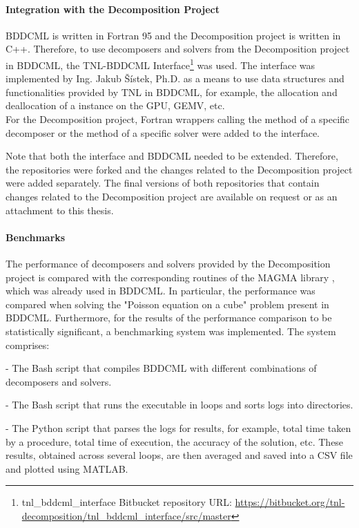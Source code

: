 \paragraph{Integration with the Decomposition Project} BDDCML is written in Fortran 95 and the Decomposition project is written in C++.
Therefore, to use decomposers and solvers from the Decomposition project in BDDCML, the TNL-BDDCML Interface\footnote{tnl\_bddcml\_interface Bitbucket repository URL: \url{https://bitbucket.org/tnl-decomposition/tnl_bddcml_interface/src/master}} was used.
The interface was implemented by Ing.
Jakub Šístek, Ph.D. as a means to use data structures and functionalities provided by TNL in BDDCML, for example, the allocation and deallocation of a  instance on the GPU, GEMV, etc.\\
For the Decomposition project, Fortran wrappers calling the  method of a specific decomposer or the  method of a specific solver were added to the interface.

Note that both the interface and BDDCML needed to be extended.
Therefore, the repositories were forked and the changes related to the Decomposition project were added separately.
The final versions of both repositories that contain changes related to the Decomposition project are available on request or as an attachment to this thesis.

\paragraph{Benchmarks} The performance of decomposers and solvers provided by the Decomposition project is compared with the corresponding routines of the MAGMA library \cite{Tomov2010}, which was already used in BDDCML.
In particular, the performance was compared when solving the "Poisson equation on a cube" problem present in BDDCML.
Furthermore, for the results of the performance comparison to be statistically significant, a benchmarking system was implemented.
The system comprises:

\begin{tight_itemize}
	\item {} - The Bash script that compiles BDDCML with different combinations of decomposers and solvers.
	\item {} - The Bash script that runs the  executable in loops and sorts logs into directories.
	\item {} - The Python script that parses the logs for results, for example, total time taken by a procedure, total time of execution, the accuracy of the solution, etc.
These results, obtained across several loops, are then averaged and saved into a CSV file and plotted using MATLAB.
\end{tight_itemize}